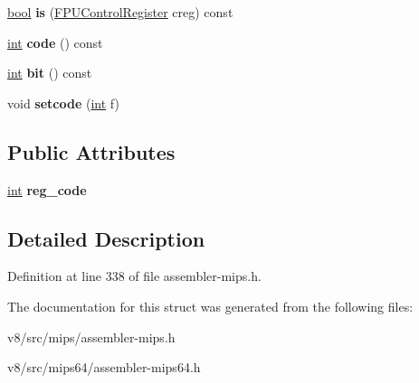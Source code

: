 \begin{DoxyCompactItemize}
\mbox{\label{structv8_1_1internal_1_1FPUControlRegister_a55d84f34424cd8465a427ee79f1be26e}} 
\mbox{\hyperlink{classbool}{bool}} {\bfseries is} (\mbox{\hyperlink{structv8_1_1internal_1_1FPUControlRegister}{F\+P\+U\+Control\+Register}} creg) const
\item 
\mbox{\label{structv8_1_1internal_1_1FPUControlRegister_a4ad75fa5a8bf43d84eb6c304abef9030}} 
\mbox{\hyperlink{classint}{int}} {\bfseries code} () const
\item 
\mbox{\label{structv8_1_1internal_1_1FPUControlRegister_a03c6c4bad593ad8f1f9c473267fa9789}} 
\mbox{\hyperlink{classint}{int}} {\bfseries bit} () const
\item 
\mbox{\label{structv8_1_1internal_1_1FPUControlRegister_a6f06c7ced9e245e228cc87cd9549984a}} 
void {\bfseries setcode} (\mbox{\hyperlink{classint}{int}} f)
\end{DoxyCompactItemize}
\subsection*{Public Attributes}
\begin{DoxyCompactItemize}
\item 
\mbox{\label{structv8_1_1internal_1_1FPUControlRegister_a435ea2a706f1ef1da23ff4abb2dd1313}} 
\mbox{\hyperlink{classint}{int}} {\bfseries reg\+\_\+code}
\end{DoxyCompactItemize}


\subsection{Detailed Description}


Definition at line 338 of file assembler-\/mips.\+h.



The documentation for this struct was generated from the following files\+:\begin{DoxyCompactItemize}
\item 
v8/src/mips/assembler-\/mips.\+h\item 
v8/src/mips64/assembler-\/mips64.\+h\end{DoxyCompactItemize}
